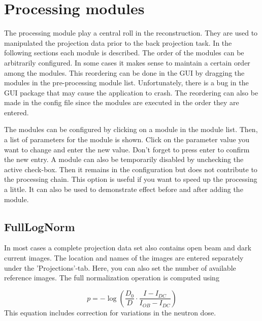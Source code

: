 \documentclass[a4paper]{scrreprt}
\begin{document}
\section{Processing modules}
The processing module play a central roll in the reconstruction. They are used
to manipulated the projection data prior to the back projection task. In the
following sections each module is described. The order of the modules can be
arbitrarily configured. In some cases it makes sense to maintain a certain
order among the modules. This reordering can be done in the GUI by dragging the
modules in the pre-processing module list. Unfortunately, there is a bug in the
GUI package that may cause the application to crash. The reordering can also be
made in the config file since the modules are executed in the order they are
entered.

The modules can be configured by clicking on a module in the module list. Then,
a list of parameters for the module is shown. Click on the parameter value you
want to change and enter the new value. Don't forget to press enter to confirm
the new entry. A module can also be temporarily disabled by unchecking the
active check-box. Then it remains in the configuration but does not contribute
to the processing chain. This option is useful if you want to speed up the
processing a little. It can also be used to demonstrate effect before and after
adding the module.

\subsection{FullLogNorm}
In most cases a complete projection data set also contains open beam and dark
current images. The location and names of the images are entered separately
under the 'Projections'-tab. Here, you can also set the number of available
reference images. The full normalization operation is computed using

\begin{equation}
p=-\log\left(\frac{D_0}{D}\cdot\frac{I-I_{DC}}{I_{OB}-I_{DC}}\right)
\end{equation}
This equation includes correction for variations in the neutron dose.
\end{document}
